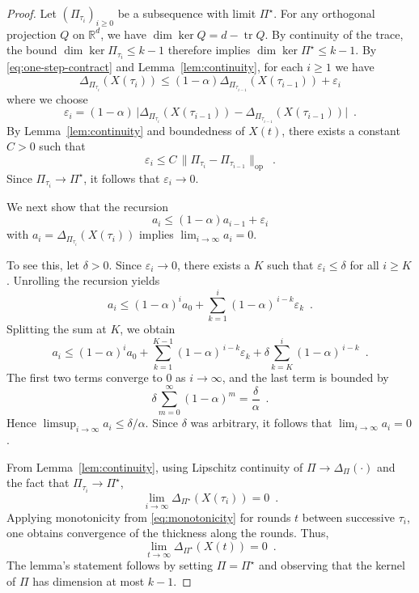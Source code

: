 \documentclass[preprint,12pt,a4paper]{elsarticle}
\theoremstyle{plain}
\theoremstyle{definition}
\newcommand{\IR}{\mathbb{R}}
\renewcommand{\le}{\leqslant}
\renewcommand{\leq}{\leqslant}
\renewcommand{\ge}{\geqslant}
\renewcommand{\geq}{\geqslant}
\begin{document}
\begin{proof}
	Let $(\Pi_{\tau_i})_{i \geq 0}$ be a subsequence with limit $\Pi^\star$.
	For any orthogonal projection $Q$ on $\IR^d$, we have $\dim\ker Q=d-\operatorname{tr}Q$.
	By continuity of the trace, the bound $\dim\ker\Pi_{\tau_i}\leq k-1$ therefore implies $\dim\ker\Pi^\star\leq k-1$.
	By \eqref{eq:one-step-contract} and Lemma~\ref{lem:continuity}, for each $i \geq 1$ we have
	\[
		\Delta_{\Pi_{\tau_i}}(X(\tau_i))
		\le (1-\alpha)\Delta_{\Pi_{\tau_{i-1}}}(X(\tau_{i-1}))
		+ \varepsilon_i
	\]
	where we choose
	\[
		\varepsilon_i = (1-\alpha)\,
		\big|
		\Delta_{\Pi_{\tau_i}}(X(\tau_{i-1}))
		-
		\Delta_{\Pi_{\tau_{i-1}}}(X(\tau_{i-1}))
		\big| \enspace.
	\]
	By Lemma~\ref{lem:continuity} and boundedness of $X(t)$, there exists a constant $C>0$ such that
	\[
		\varepsilon_i \le C \,\|\Pi_{\tau_i}-\Pi_{\tau_{i-1}}\|_{\mathrm{op}} \enspace.
	\]
	Since $\Pi_{\tau_i} \to \Pi^\star$, it follows that $\varepsilon_i \to 0$.

	We next show that the recursion
	\[
		a_i \le (1-\alpha)a_{i-1} + \varepsilon_i
	\]
	with $a_i = \Delta_{\Pi_{\tau_i}}(X(\tau_i))$ implies
	$
		\lim_{i\to\infty} a_i = 0
	$.

	To see this, let $\delta>0$.
	Since $\varepsilon_i \to 0$, there exists a $K$ such that
	$\varepsilon_i \le \delta$ for all $i \ge K$.
	Unrolling the recursion yields
	\[
		a_i
		\le (1-\alpha)^i a_0
		+ \sum_{k=1}^i (1-\alpha)^{\,i-k}\varepsilon_k \enspace.
	\]
	Splitting the sum at $K$, we obtain
	\[
		a_i
		\le (1-\alpha)^i a_0
		+ \sum_{k=1}^{K-1}(1-\alpha)^{\,i-k}\varepsilon_k
		+ \delta \sum_{k=K}^{i}(1-\alpha)^{\,i-k} \enspace.
	\]
	The first two terms converge to $0$ as $i\to\infty$, and the last term is bounded by
	\[
		\delta \sum_{m=0}^{\infty}(1-\alpha)^m = \frac{\delta}{\alpha} \enspace.
	\]
	Hence $\limsup_{i\to\infty} a_i \le \delta/\alpha$.
	Since $\delta$ was arbitrary, it follows that $\lim_{i\to\infty} a_i = 0$.


	From Lemma~\ref{lem:continuity}, using Lipschitz continuity of $\Pi \to \Delta_\Pi(\cdot)$
	and the fact that $\Pi_{\tau_i} \to \Pi^\star$,
	\[
		\lim_{i \to \infty} \Delta_{\Pi^\star}(X(\tau_i)) = 0\enspace.
	\]
	Applying monotonicity from \eqref{eq:monotonicity} for rounds $t$ between successive $\tau_i$, one obtains convergence of the thickness along the rounds. Thus,
	\[
		\lim_{t \to \infty} \Delta_{\Pi^\star}(X(t)) = 0\enspace.
	\]
	The lemma's statement follows by setting $\Pi = \Pi^\star$ and observing that
	the kernel of $\Pi$ has dimension at most $k-1$.
\end{proof}
\end{document}
